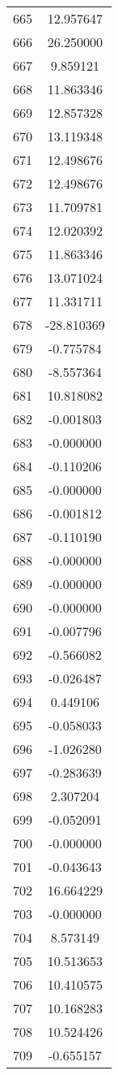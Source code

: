 \documentclass[12pt]{article}
\begin{document}
\begin{longtable}{@{}cc@{}}
665 & 12.957647 \\
666 & 26.250000 \\
667 & 9.859121 \\
668 & 11.863346 \\
669 & 12.857328 \\
670 & 13.119348 \\
671 & 12.498676 \\
672 & 12.498676 \\
673 & 11.709781 \\
674 & 12.020392 \\
675 & 11.863346 \\
676 & 13.071024 \\
677 & 11.331711 \\
678 & -28.810369 \\
679 & -0.775784 \\
680 & -8.557364 \\
681 & 10.818082 \\
682 & -0.001803 \\
683 & -0.000000 \\
684 & -0.110206 \\
685 & -0.000000 \\
686 & -0.001812 \\
687 & -0.110190 \\
688 & -0.000000 \\
689 & -0.000000 \\
690 & -0.000000 \\
691 & -0.007796 \\
692 & -0.566082 \\
693 & -0.026487 \\
694 & 0.449106 \\
695 & -0.058033 \\
696 & -1.026280 \\
697 & -0.283639 \\
698 & 2.307204 \\
699 & -0.052091 \\
700 & -0.000000 \\
701 & -0.043643 \\
702 & 16.664229 \\
703 & -0.000000 \\
704 & 8.573149 \\
705 & 10.513653 \\
706 & 10.410575 \\
707 & 10.168283 \\
708 & 10.524426 \\
709 & -0.655157 \\

\end{longtable}
\end{document}
